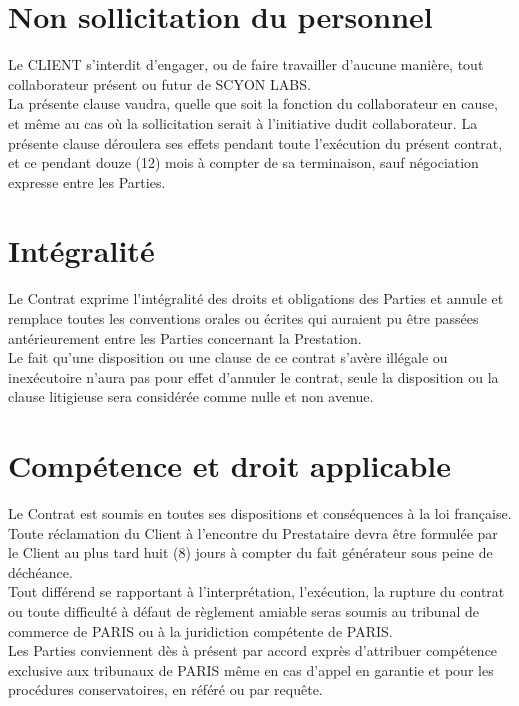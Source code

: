 \documentclass[9pt,french]{base}
\def \companyname {SCYON LABS}
\begin{document}
\begin{multicols*}{3}
\section{Non sollicitation du personnel}

Le CLIENT s'interdit d'engager, ou de faire travailler d'aucune manière, tout collaborateur présent ou futur de \companyname. \\
La présente clause vaudra, quelle que soit la fonction du collaborateur en cause, et même au cas où la sollicitation serait à l'initiative dudit collaborateur. La présente clause déroulera ses effets pendant toute l'exécution du présent contrat, et ce pendant douze (12) mois à compter de sa terminaison, sauf négociation expresse entre les Parties.

\section{Intégralité}

Le Contrat exprime l’intégralité des droits et obligations des Parties et annule et remplace toutes les conventions orales ou écrites qui auraient pu être passées antérieurement entre les Parties concernant la Prestation. \\
Le fait qu’une disposition ou une clause de ce contrat s’avère illégale ou inexécutoire n’aura pas pour effet d’annuler le contrat, seule la disposition ou la clause litigieuse sera considérée comme nulle et non avenue.

\section{Compétence et droit applicable}

Le Contrat est soumis en toutes ses dispositions et conséquences à la loi française. \\
Toute réclamation du Client à l’encontre du Prestataire devra être formulée par le Client au plus tard huit (8) jours à compter du fait générateur sous peine de déchéance. \\
Tout différend se rapportant à l’interprétation, l’exécution, la rupture du contrat ou toute difficulté à défaut de règlement amiable seras soumis au tribunal de commerce de PARIS ou à la juridiction compétente de PARIS. \\
Les Parties conviennent dès à présent par accord exprès d’attribuer compétence exclusive aux tribunaux de PARIS même en cas d’appel en garantie et pour les procédures conservatoires, en référé ou par requête.

\end{multicols*}
\end{document}
